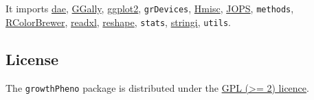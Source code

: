 \documentclass[
]{article}
\begin{document}
It imports \href{https://CRAN.R-project.org/package=dae}{dae},
\href{https://CRAN.R-project.org/package=GGally}{GGally},
\href{https://CRAN.R-project.org/package=ggplot2}{ggplot2},
\texttt{grDevices},
\href{https://CRAN.R-project.org/package=Hmisc}{Hmisc},
\href{https://CRAN.R-project.org/package=JOPS}{JOPS}, \texttt{methods},
\href{https://CRAN.R-project.org/package=RColorBrewer}{RColorBrewer},
\href{https://CRAN.R-project.org/package=readxl}{readxl},
\href{https://CRAN.R-project.org/package=reshape}{reshape},
\texttt{stats},
\href{https://CRAN.R-project.org/package=stringi}{stringi},
\texttt{utils}.

\hypertarget{license}{%
\subsection{License}\label{license}}

The \texttt{growthPheno} package is distributed under the
\href{https://opensource.org/licenses/GPL-2.0}{GPL (\textgreater= 2)
licence}.
\end{document}

